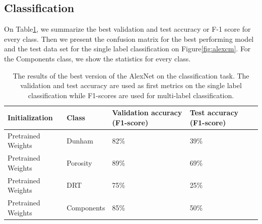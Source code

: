 \subsection{Classification}
On Table\ref{tab:alexbest}, we summarize the best validation and test accuracy or F-1 score for every class. Then we present the confusion matrix for the best performing model and the test data set for the single label classification on Figure\ref{fig:alexcm}. For the Components class, we show the statistics for every class. 

\begin{table}
\caption{\label{tab:alexbest} The results of the best version of the AlexNet on the classification task. The validation and test accuracy are used as first metrics on the single label classification while F1-scores are used for multi-label classification.}
\centering
\begin{tabular}[b]{| l | l | l | l | l |}
\hline
    Initialization & Class & Validation accuracy (F1-score) & Test accuracy (F1-score)  \\ \hline
    Pretrained Weights & Dunham &  82\%  & 39\% \\ \hline
    Pretrained Weights & Porosity & 89\%  &  69\% \\ \hline
    Pretrained Weights &DRT & 75\% &  25\% \\ \hline
    Pretrained Weights &Components & 85\% &  50\% \\ \hline
\end{tabular} 
\end{table}

